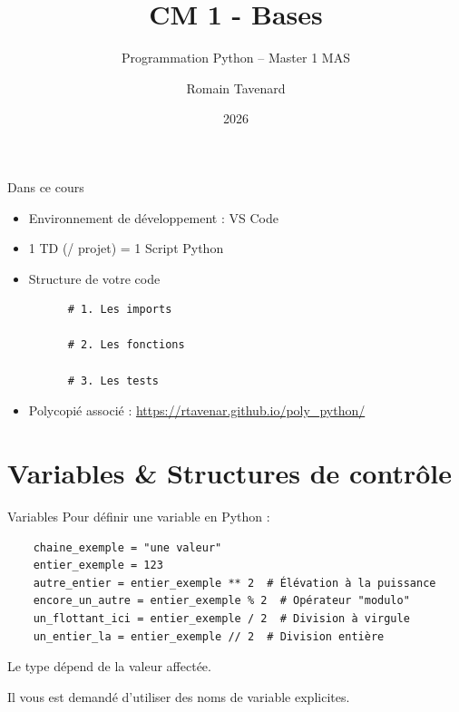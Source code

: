 \documentclass[10pt]{beamer}
\title[M1 MAS -- Python -- Bases]{CM 1 - Bases}
\subtitle{Programmation Python -- Master 1 MAS}
\author{Romain Tavenard}
\date{2026}
\institute{%
\hypersetup{urlcolor=.}
\makebox[2.2ex][c]{\faEnvelope}\enspace\href{mailto:romain.tavenard@univ-rennes2.fr}{\texttt{romain.tavenard@univ-rennes2.fr}}\\%
}
\begin{document}
\maketitle

\begin{frame}[fragile]{Dans ce cours}  
  \begin{itemize}
    \item Environnement de développement : VS Code
    \item 1 TD (/ projet) = 1 Script Python
    \item Structure de votre code
    \begin{beamercodeblock}
      \begin{verbatim}
      # 1. Les imports
  
      # 2. Les fonctions
  
      # 3. Les tests
      \end{verbatim}
    \end{beamercodeblock}
    \item Polycopié associé : \url{https://rtavenar.github.io/poly_python/}
  \end{itemize}

\end{frame}

\section{Variables \& Structures de contrôle}

\begin{frame}[fragile]{Variables}  
  Pour définir une variable en Python :
  \begin{beamercodeblock}
    \begin{verbatim}
    chaine_exemple = "une valeur"
    entier_exemple = 123
    autre_entier = entier_exemple ** 2  # Élévation à la puissance
    encore_un_autre = entier_exemple % 2  # Opérateur "modulo"
    un_flottant_ici = entier_exemple / 2  # Division à virgule
    un_entier_la = entier_exemple // 2  # Division entière
    \end{verbatim}
  \end{beamercodeblock}
  Le type dépend de la valeur affectée.

  Il vous est demandé d'utiliser des \alert{noms de variable explicites}.
\end{frame}
\end{document}
